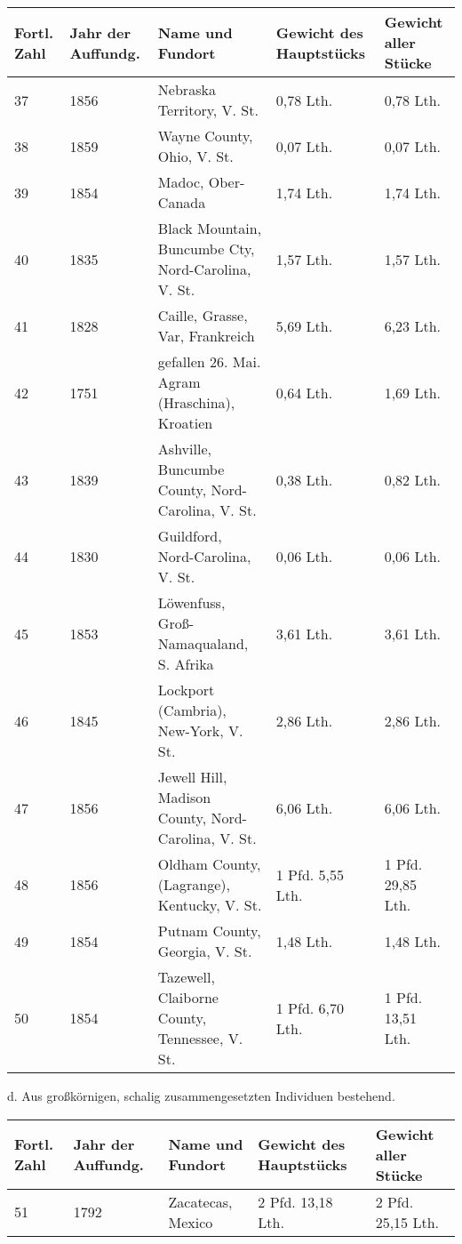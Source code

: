 \documentclass[a4paper, 11pt, oneside]{article}
\begin{document}
\begin{center}
\begin{footnotesize}
\begin{tabular}{ |p{7mm}|p{9mm}|p{48mm}|p{20mm}|p{23mm}| }
    \hline
    Fortl. Zahl & Jahr der Auffundg. & Name und Fundort & Gewicht des Hauptstücks & Gewicht aller Stücke\\
    \hline\hline
    37 & 1856 & Nebraska Territory, V. St. & 0,78 Lth. & 0,78 Lth.\\\hline
    38 & 1859 & Wayne County, Ohio, V. St. & 0,07 Lth. & 0,07 Lth.\\\hline
    39 & 1854 & Madoc, Ober-Canada & 1,74 Lth. & 1,74 Lth.\\\hline
    40 & 1835 & Black Mountain, Buncumbe Cty, Nord-Carolina, V. St. & 1,57 Lth. & 1,57 Lth.\\\hline
    41 & 1828 & Caille, Grasse, Var, Frankreich & 5,69 Lth. & 6,23 Lth.\\\hline
    42 & 1751 & gefallen 26. Mai. Agram (Hraschina), Kroatien & 0,64 Lth. & 1,69 Lth.\\
    43 & 1839 & Ashville, Buncumbe County, Nord-Carolina, V. St. & 0,38 Lth. & 0,82 Lth.\\\hline
    44 & 1830 & Guildford, Nord-Carolina, V. St. & 0,06 Lth. & 0,06 Lth.\\\hline
    45 & 1853 & Löwenfuss, Groß-Namaqualand, S. Afrika & 3,61 Lth. & 3,61 Lth.\\\hline
    46 & 1845 & Lockport (Cambria), New-York, V. St. & 2,86 Lth. & 2,86 Lth.\\\hline
    47 & 1856 & Jewell Hill, Madison County, Nord-Carolina, V. St. & 6,06 Lth. & 6,06 Lth.\\\hline
    48 & 1856 & Oldham County, (Lagrange), Kentucky, V. St. & 1 Pfd. 5,55 Lth. & 1 Pfd. 29,85 Lth.\\\hline
    49 & 1854 & Putnam County, Georgia, V. St. & 1,48 Lth. & 1,48 Lth.\\\hline
    50 & 1854 & Tazewell, Claiborne County, Tennessee, V. St. & 1 Pfd. 6,70 Lth. & 1 Pfd. 13,51 Lth.\\
    \hline
\end{tabular}
\end{footnotesize}
\end{center}
\begin{center}
d. Aus großkörnigen, schalig zusammengesetzten Individuen bestehend.
\end{center}
\begin{center}
\begin{footnotesize}
\begin{tabular}{ |p{7mm}|p{9mm}|p{45mm}|p{24mm}|p{24mm}| }
    \hline
    Fortl. Zahl & Jahr der Auffundg. & Name und Fundort & Gewicht des Hauptstücks & Gewicht aller Stücke\\
    \hline\hline
    51 & 1792 & Zacatecas, Mexico & 2 Pfd. 13,18 Lth. & 2 Pfd. 25,15 Lth.\\
    \hline
\end{tabular}
\end{footnotesize}
\end{center}
\end{document}
